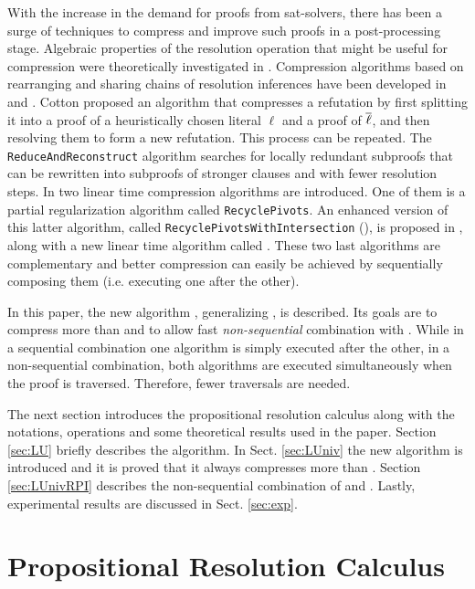 \documentclass{llncs}
\begin{document}
With the increase in the demand for proofs from sat-solvers, there has been a surge of techniques to
compress and improve such proofs in a post-processing stage.  Algebraic properties of the resolution
operation that might be useful for compression were theoretically investigated in \cite{bwp10}.
Compression algorithms based on rearranging and sharing chains of resolution inferences have been
developed in \cite{Amjad07} and \cite{Sinz}.  Cotton \cite{CottonSplit} proposed an algorithm that
compresses a refutation by first splitting it into a proof of a heuristically chosen literal $\ell$
and a proof of $\overline{\ell}$, and then resolving them to form a new refutation. This process can be
repeated.  The \texttt{ReduceAndReconstruct} algorithm \cite{RedRec} searches for locally redundant
subproofs that can be rewritten into subproofs of stronger clauses and with fewer resolution steps.
In \cite{RP08} two linear time compression algorithms are introduced. One of them is a partial
regularization algorithm called \texttt{RecyclePivots}.  An enhanced version of this latter
algorithm, called \texttt{RecyclePivotsWithIntersection} ({\RPI}), is proposed in \cite{LURPI},
along with a new linear time algorithm called {\LowerUnits}.  These two last algorithms are
complementary and better compression can easily be achieved by sequentially composing them (i.e.
executing one after the other).

In this paper, the new algorithm {\LowerUnivalents}, generalizing {\LowerUnits}, is described. Its
goals are to compress more than {\LowerUnits} and to allow fast \emph{non-sequential}  combination
with {\RPI}. While in a sequential combination one algorithm is simply executed after the other, in
a non-sequential combination, both algorithms are executed simultaneously when the proof is
traversed. Therefore, fewer traversals are needed.

The next section introduces the propositional resolution calculus along with the notations,
operations and some theoretical results used in the paper. Section \ref{sec:LU} briefly describes
the {\LowerUnits} algorithm. In Sect. \ref{sec:LUniv} the new algorithm {\LowerUnivalents} is
introduced and it is proved that it always compresses more than {\LowerUnits}. Section
\ref{sec:LUnivRPI} describes the non-sequential combination of {\LowerUnivalents} and {\RPI}.
Lastly, experimental results are discussed in Sect. \ref{sec:exp}.



\section{Propositional Resolution Calculus}
\end{document}
